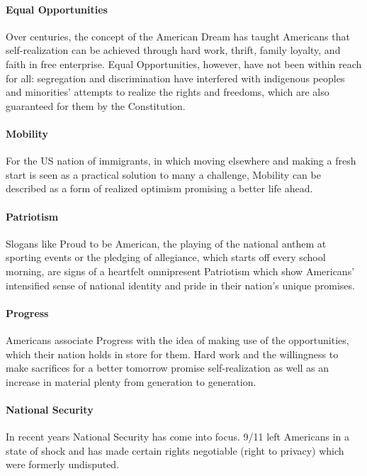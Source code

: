 \documentclass[10pt]{article}
\begin{document}
\paragraph{Equal Opportunities}
\label{par:usa/values/eqop}
Over centuries, the concept of the American Dream has taught Americans that
self-realization can be achieved through hard work, thrift, family loyalty, and faith
in free enterprise. Equal Opportunities, however, have not been within reach for all: segregation and
discrimination have interfered with indigenous peoples and minorities' attempts
to realize the rights and freedoms, which are also guaranteed for them by the
Constitution.

\paragraph{Mobility}
\label{par:usa/values/mob}
For the US nation of immigrants, in which moving elsewhere and making a fresh
start is seen as a practical solution to many a challenge, Mobility can be described as a
form of realized optimism promising a better life ahead.

\paragraph{Patriotism}
\label{par:usa/values/pat}
Slogans like Proud to be American, the playing of the national anthem at sporting
events or the pledging of allegiance, which starts off every school morning, are
signs of a heartfelt omnipresent Patriotism which show Americans' intensified sense of
national identity and pride in their nation's unique promises.

\paragraph{Progress}
\label{par:usa/values/prog}
Americans associate Progress with the idea of making use of the opportunities, which
their nation holds in store for them. Hard work and the willingness to make sacrifices
for a better tomorrow promise self-realization as well as an increase in
material plenty from generation to generation.

\paragraph{National Security}
\label{par:usa/values/natsec}
In recent years National Security has come into focus. 9/11 left Americans in a state of shock
and has made certain rights negotiable (right to privacy) which were formerly
undisputed.
\end{document}
